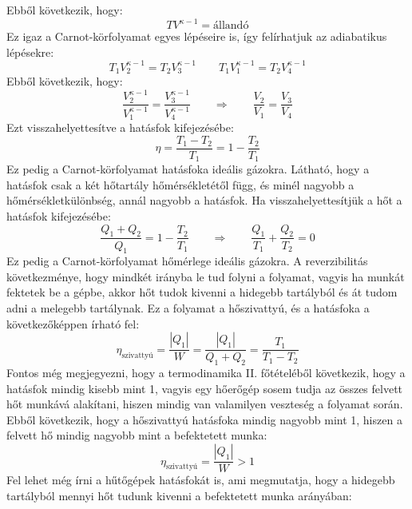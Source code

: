 \documentclass[../main.tex]{subfiles}
\begin{document}
Ebből következik, hogy:
\begin{equation}
    T V^{\kappa - 1} = \text{állandó}
\end{equation}
Ez igaz a Carnot-körfolyamat egyes lépéseire is, így felírhatjuk az adiabatikus lépésekre:
\begin{equation}
    T_1 V_2^{\kappa - 1} = T_2 V_3^{\kappa - 1} \qquad T_1 V_1^{\kappa - 1} = T_2 V_4^{\kappa - 1}
\end{equation}
Ebből következik, hogy:
\begin{equation}
    \frac{V_2^{\kappa - 1}}{V_1^{\kappa - 1}} = \frac{V_3^{\kappa - 1}}{V_4^{\kappa - 1}} \qquad \Rightarrow \qquad \frac{V_2}{V_1} = \frac{V_3}{V_4}
\end{equation}
Ezt visszahelyettesítve a hatásfok kifejezésébe:
\begin{equation}
    \eta = \frac{T_1 - T_2}{T_1} = 1 - \frac{T_2}{T_1}
\end{equation}
Ez pedig a Carnot-körfolyamat hatásfoka ideális gázokra. Látható, hogy a hatásfok csak a két hőtartály hőmérsékletétől függ, és minél nagyobb a hőmérsékletkülönbség, annál nagyobb a hatásfok.
Ha visszahelyettesítjük a hőt a hatásfok kifejezésébe:
\begin{equation}
    \frac{Q_1 + Q_2}{Q_1} = 1 - \frac{T_2}{T_1} \qquad \Rightarrow \qquad \boxed{\frac{Q_1}{T_1} + \frac{Q_2}{T_2} = 0}
\end{equation}
Ez pedig a Carnot-körfolyamat hőmérlege ideális gázokra.
A reverzibilitás következménye, hogy mindkét irányba le tud folyni a folyamat, vagyis ha munkát fektetek be a gépbe, akkor hőt tudok kivenni a hidegebb tartályból és át tudom adni a melegebb tartálynak.
Ez a folyamat a hőszivattyú, és a hatásfoka a következőképpen írható fel:
\begin{equation}
    \eta_{\text{szivattyú}} = \frac{|Q_1|}{W} = \frac{|Q_1|}{Q_1 + Q_2} = \frac{T_1}{T_1 - T_2}
\end{equation}
Fontos még megjegyezni, hogy a termodinamika II. főtételéből következik, hogy a hatásfok mindig kisebb mint 1, vagyis egy hőerőgép sosem tudja az összes felvett hőt munkává alakítani, hiszen mindig van valamilyen veszteség a folyamat során.
Ebből következik, hogy a hőszivattyú hatásfoka mindig nagyobb mint 1, hiszen a felvett hő mindig nagyobb mint a befektetett munka:
\begin{equation}
    \eta_{\text{szivattyú}} = \frac{|Q_1|}{W} > 1
\end{equation}
Fel lehet még írni a hűtőgépek hatásfokát is, ami megmutatja, hogy a hidegebb tartályból mennyi hőt tudunk kivenni a befektetett munka arányában:
\end{document}
